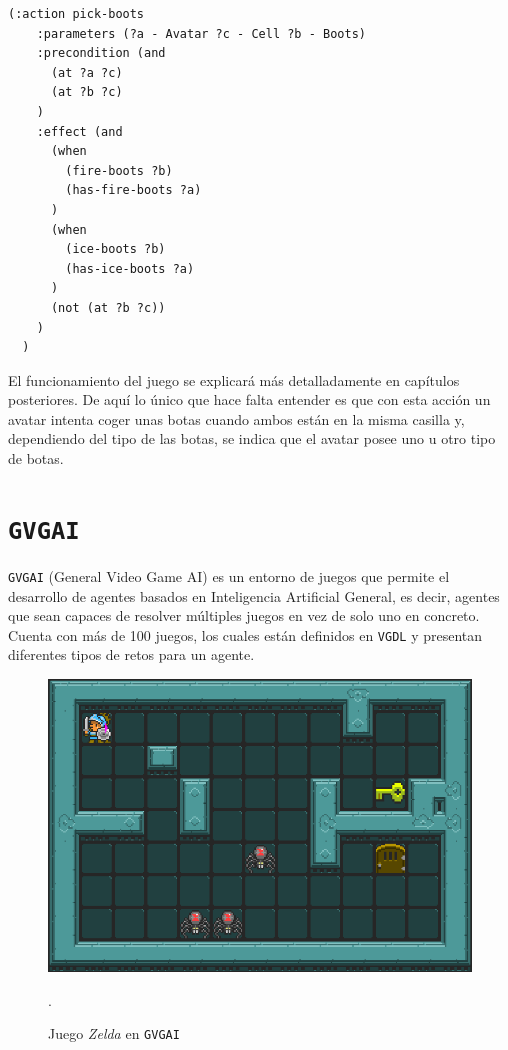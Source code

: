 \begin{lstlisting}[language=PDDL, caption={Ejemplo de efecto condicional.},captionpos=b]
  (:action pick-boots
    :parameters (?a - Avatar ?c - Cell ?b - Boots)
    :precondition (and
      (at ?a ?c)
      (at ?b ?c)
    )
    :effect (and
      (when
        (fire-boots ?b)
        (has-fire-boots ?a)
      )
      (when
        (ice-boots ?b)
        (has-ice-boots ?a)
      )
      (not (at ?b ?c))
    )
  )
\end{lstlisting}

El funcionamiento del juego se explicará más detalladamente en capítulos posteriores. De aquí
lo único que hace falta entender es que con esta acción un avatar intenta coger unas botas cuando
ambos están en la misma casilla y, dependiendo del tipo de las botas, se indica que
el avatar posee uno u otro tipo de botas.

\section{\texttt{GVGAI}}

\texttt{GVGAI} (General Video Game AI) \cite{7038214} es un entorno de juegos que permite
el desarrollo de agentes basados en Inteligencia Artificial General, es decir, agentes que sean
capaces de resolver múltiples juegos en vez de solo uno en concreto. Cuenta con más de 100 juegos,
los cuales están definidos en \texttt{VGDL} y presentan diferentes tipos de retos para un agente.

\begin{figure}[H]
    \centering
    \includegraphics[scale=0.4]{img/CH02/zelda.png}
    \caption{Juego \textit{Zelda} en \texttt{GVGAI}}.
    \label{fig:zelda}
\end{figure}

